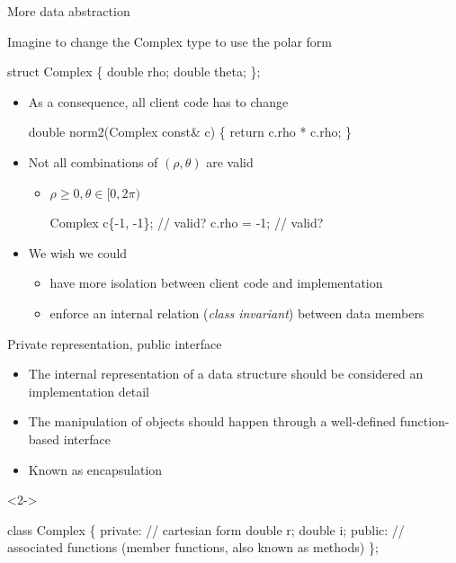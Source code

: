 \begin{frame}[fragile]{More data abstraction}

  Imagine to change the Complex type to use the polar form

  \begin{codeblock}
struct Complex \{
  double rho;
  double theta;
\};\end{codeblock}

  \begin{itemize}
  \item<2-> As a consequence, all client code has to change
    \begin{codeblock}
double norm2(Complex const& c) \{ return c.rho * c.rho; \}\end{codeblock}
  \item<3-> Not all combinations of $(\rho,\theta)$ are valid
    \begin{itemize}
    \item $\rho \geq 0, \theta \in [0, 2\pi)$
      \begin{codeblock}
Complex c\{-1, -1\}; // valid?
c.rho = -1;        // valid?\end{codeblock}
    \end{itemize}
  \end{itemize}

  \begin{itemize}
  \item<4-> We wish we could
    \begin{itemize}
    \item have more isolation between client code and implementation
    \item enforce an internal relation (\textit{class invariant}) between data
      members
    \end{itemize}
  \end{itemize}

\end{frame}

\begin{frame}[fragile]{Private representation, public interface}

  \begin{itemize}
  \item The internal representation of a data structure should be considered an
    implementation detail
  \item The manipulation of objects should happen through a
    well-defined function-based interface
  \item Known as \alert{encapsulation}
  \end{itemize}

\begin{codeblock}<2->{
\alert<2>{class} Complex \{
 \alert<2-4>{private}: // cartesian form
  double r;
  double i;
 \alert<2>{public}:
  // associated functions (member functions, also known as methods)
\};

}\end{codeblock}

\end{frame}

